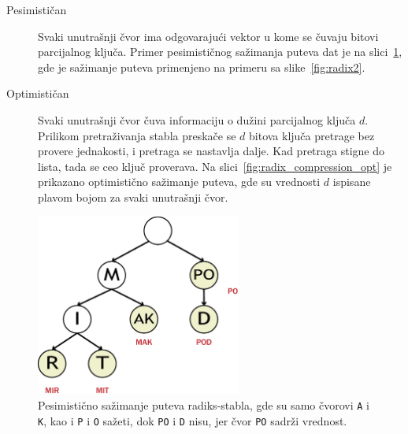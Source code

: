 \documentclass[12pt,oneside]{memoir}
\begin{document}
\begin{description}
  \item[Pesimističan] Svaki unutrašnji čvor ima odgovarajući vektor
        u kome se čuvaju bitovi parcijalnog ključa. Primer pesimističnog
        sažimanja puteva dat je na slici~\ref{fig:radix_compression},
        gde je sažimanje puteva primenjeno na primeru sa
        slike~\ref{fig:radix2}.
  \item[Optimističan] Svaki unutrašnji čvor čuva informaciju o dužini
        parcijalnog ključa $d$. Prilikom pretraživanja stabla preskače se
        $d$ bitova ključa pretrage bez provere jednakosti,
        i pretraga se nastavlja dalje.
        Kad pretraga stigne do lista, tada se ceo ključ proverava.
        Na slici~\ref{fig:radix_compression_opt} je prikazano
        optimistično sažimanje puteva, gde su vrednosti $d$
        ispisane plavom bojom za svaki unutrašnji čvor.
\end{description}

\begin{figure}[!h]
  \centering
  \includegraphics[width=0.60\textwidth]{radix_compression.eps}
  \caption{Pesimistično sažimanje puteva radiks-stabla, gde su samo
    čvorovi \texttt{A} i \texttt{K}, kao i \texttt{P} i \texttt{O} sažeti,
    dok \texttt{PO} i \texttt{D} nisu, jer čvor \texttt{PO}
    sadrži vrednost.}
  \label{fig:radix_compression}
\end{figure}
\end{document}
